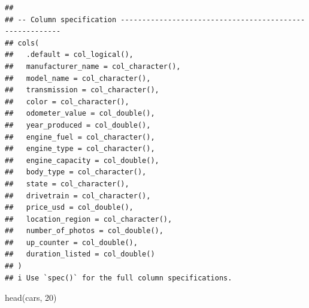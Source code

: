 \documentclass[
]{article}
\newenvironment{Shaded}{\begin{snugshade}}{\end{snugshade}}
\newcommand{\DecValTok}[1]{\textcolor[rgb]{0.00,0.00,0.81}{#1}}
\newcommand{\FunctionTok}[1]{\textcolor[rgb]{0.00,0.00,0.00}{#1}}
\newcommand{\NormalTok}[1]{#1}
\begin{document}
\begin{verbatim}
## 
## -- Column specification --------------------------------------------------------
## cols(
##   .default = col_logical(),
##   manufacturer_name = col_character(),
##   model_name = col_character(),
##   transmission = col_character(),
##   color = col_character(),
##   odometer_value = col_double(),
##   year_produced = col_double(),
##   engine_fuel = col_character(),
##   engine_type = col_character(),
##   engine_capacity = col_double(),
##   body_type = col_character(),
##   state = col_character(),
##   drivetrain = col_character(),
##   price_usd = col_double(),
##   location_region = col_character(),
##   number_of_photos = col_double(),
##   up_counter = col_double(),
##   duration_listed = col_double()
## )
## i Use `spec()` for the full column specifications.
\end{verbatim}

\begin{Shaded}
\begin{Highlighting}[]
\FunctionTok{head}\NormalTok{(cars, }\DecValTok{20}\NormalTok{)}
\end{Highlighting}
\end{Shaded}
\end{document}
